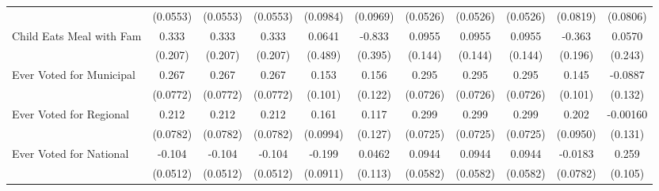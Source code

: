 {\begin{tabular}{l*{10}{c}}
            &    (0.0553)         &    (0.0553)         &    (0.0553)         &    (0.0984)         &    (0.0969)         &    (0.0526)         &    (0.0526)         &    (0.0526)         &    (0.0819)         &    (0.0806)         \\
\addlinespace
Child Eats Meal with Fam&       0.333         &       0.333         &       0.333         &      0.0641         &      -0.833\sym{*}  &      0.0955         &      0.0955         &      0.0955         &      -0.363         &      0.0570         \\
            &     (0.207)         &     (0.207)         &     (0.207)         &     (0.489)         &     (0.395)         &     (0.144)         &     (0.144)         &     (0.144)         &     (0.196)         &     (0.243)         \\
\addlinespace
Ever Voted for Municipal&       0.267\sym{***}&       0.267\sym{***}&       0.267\sym{***}&       0.153         &       0.156         &       0.295\sym{***}&       0.295\sym{***}&       0.295\sym{***}&       0.145         &     -0.0887         \\
            &    (0.0772)         &    (0.0772)         &    (0.0772)         &     (0.101)         &     (0.122)         &    (0.0726)         &    (0.0726)         &    (0.0726)         &     (0.101)         &     (0.132)         \\
\addlinespace
Ever Voted for Regional&       0.212\sym{**} &       0.212\sym{**} &       0.212\sym{**} &       0.161         &       0.117         &       0.299\sym{***}&       0.299\sym{***}&       0.299\sym{***}&       0.202\sym{*}  &    -0.00160         \\
            &    (0.0782)         &    (0.0782)         &    (0.0782)         &    (0.0994)         &     (0.127)         &    (0.0725)         &    (0.0725)         &    (0.0725)         &    (0.0950)         &     (0.131)         \\
\addlinespace
Ever Voted for National&      -0.104\sym{*}  &      -0.104\sym{*}  &      -0.104\sym{*}  &      -0.199\sym{*}  &      0.0462         &      0.0944         &      0.0944         &      0.0944         &     -0.0183         &       0.259\sym{*}  \\
            &    (0.0512)         &    (0.0512)         &    (0.0512)         &    (0.0911)         &     (0.113)         &    (0.0582)         &    (0.0582)         &    (0.0582)         &    (0.0782)         &     (0.105)         \\
\bottomrule
\end{tabular}
}
